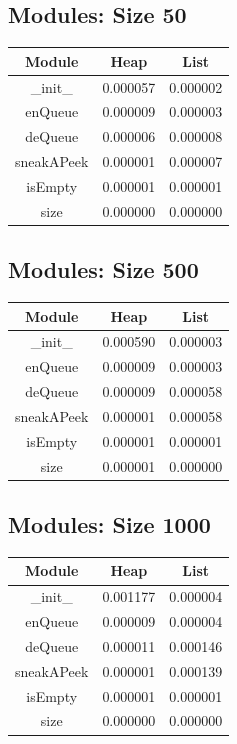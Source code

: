 \documentclass{article}
\begin{document}
\subsection{Modules: Size 50}
\begin{table}[H]
    \begin{tabular}{c c c}
        Module & Heap & List \\ \hline
        \_init\_ & 0.000057 & 0.000002 \\ 
        enQueue & 0.000009 & 0.000003 \\
        deQueue & 0.000006 & 0.000008 \\
        sneakAPeek & 0.000001 & 0.000007 \\
        isEmpty & 0.000001 & 0.000001 \\
        size & 0.000000 & 0.000000 \\
    \end{tabular}
\end{table}

\subsection{Modules: Size 500}
\begin{table}[H]
    \begin{tabular}{c c c}
        Module & Heap & List \\ \hline
        \_init\_ & 0.000590 & 0.000003 \\ 
        enQueue & 0.000009 & 0.000003 \\
        deQueue & 0.000009 & 0.000058 \\
        sneakAPeek & 0.000001 & 0.000058 \\
        isEmpty & 0.000001 & 0.000001 \\
        size & 0.000001 & 0.000000 \\
    \end{tabular}
\end{table}

\subsection{Modules: Size 1000}
\begin{table}[H]
    \begin{tabular}{c c c}
        Module & Heap & List \\ \hline
        \_init\_ & 0.001177 & 0.000004 \\ 
        enQueue & 0.000009 & 0.000004 \\
        deQueue & 0.000011 & 0.000146 \\
        sneakAPeek & 0.000001 & 0.000139 \\
        isEmpty & 0.000001 & 0.000001 \\
        size & 0.000000 & 0.000000 \\
    \end{tabular}
\end{table}
\end{document}
